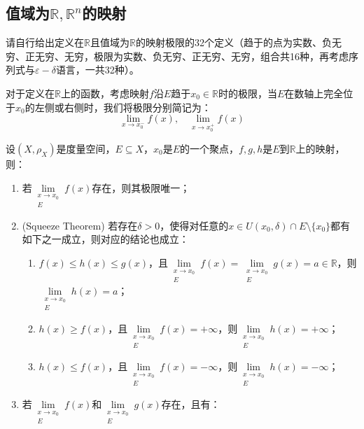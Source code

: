 \subsection{值域为$\mathbb{R},\mathbb{R}^{n}$的映射}
请自行给出定义在$\mathbb{R}$且值域为$\mathbb{R}$的映射极限的32个定义（趋于的点为实数、负无穷、正无穷、无穷，极限为实数、负无穷、正无穷、无穷，组合共16种，再考虑序列式与$\varepsilon-\delta$语言，一共32种）。\par
对于定义在$\mathbb{R}$上的函数，考虑映射$f$沿$E$趋于$x_0\in\mathbb{R}$时的极限，当$E$在数轴上完全位于$x_0$的左侧或右侧时，我们将极限分别简记为：
\begin{equation*}
	\lim_{x\to x_0^-}f(x),\quad\lim_{x\to x_0^+}f(x)
\end{equation*}
\begin{property}\label{prop:RMap}
	设$(X,\rho_X)$是度量空间，$E\subseteq X$，$x_0$是$E$的一个聚点，$f,g,h$是$E$到$\mathbb{R}$上的映射，则：
	\begin{enumerate}
		\item 若$\lim\limits_{\substack{x\to x_0 \\ E}}f(x)$存在，则其极限唯一；
		\item (Squeeze Theorem) 若存在$\delta>0$，使得对任意的$x\in U(x_0,\delta)\cap E\setminus\{x_0\}$都有如下之一成立，则对应的结论也成立：
		\begin{enumerate}
			\item $f(x)\leqslant h(x)\leqslant g(x)$，且$\lim\limits_{\substack{x\to x_0 \\ E}}f(x)=\lim\limits_{\substack{x\to x_0 \\ E}}g(x)=a\in\mathbb{R}$，则$\lim\limits_{\substack{x\to x_0 \\ E}}h(x)=a$；
			\item $h(x)\geqslant f(x)$，且$\lim\limits_{\substack{x\to x_0 \\ E}}f(x)=+\infty$，则$\lim\limits_{\substack{x\to x_0 \\ E}}h(x)=+\infty$；
			\item $h(x)\leqslant f(x)$，且$\lim\limits_{\substack{x\to x_0 \\ E}}f(x)=-\infty$，则$\lim\limits_{\substack{x\to x_0 \\ E}}h(x)=-\infty$；
		\end{enumerate}
		\item 若$\lim\limits_{\substack{x\to x_0 \\ E}}f(x)$和$\lim\limits_{\substack{x\to x_0 \\ E}}g(x)$存在，且有：
		\begin{equation*}

\end{equation*}
\end{enumerate}
\end{property}
